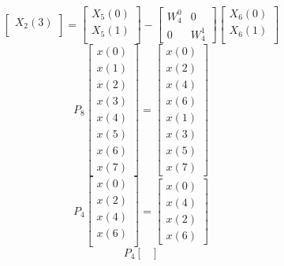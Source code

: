 \documentclass[journal,12pt,twocolumn]{IEEEtran}
\renewcommand\thesection{\arabic{section}}
\begin{document}
\begin{enumerate}[label=\arabic*.,ref=\thesection.\theenumi]
\begin{equation}
\begin{bmatrix}
X_{2}(3)\\ 
\end{bmatrix}
=
\begin{bmatrix}
X_{5}(0) \\ 
X_{5}(1)\\ 
\end{bmatrix}
-
\begin{bmatrix}
W^{0}_{4} & 0\\
0 & W^{1}_{4}
\end{bmatrix}
\begin{bmatrix}
X_{6}(0) \\ 
X_{6}(1) \\ 
\end{bmatrix}
\end{equation}
\begin{equation}
P_{8}
\begin{bmatrix}
x(0) \\ 
x(1) \\ 
x(2) \\ 
x(3) \\ 
x(4) \\ 
x(5) \\
x(6) \\
x(7)
\end{bmatrix}
 = 
\begin{bmatrix}
x(0) \\ 
x(2) \\ 
x(4) \\ 
x(6) \\
x(1) \\ 
x(3) \\ 
x(5) \\
x(7)
\end{bmatrix}
\end{equation}
\begin{equation}
P_{4}
\begin{bmatrix}
x(0) \\ 
x(2) \\ 
x(4) \\ 
x(6) \\
\end{bmatrix}
 = 
\begin{bmatrix}
x(0) \\ 
x(4) \\ 
x(2) \\
x(6)
\end{bmatrix}
\end{equation}
\begin{equation}
P_{4}
\begin{bmatrix}

\end{bmatrix}
\end{equation}
\end{enumerate}
\end{document}
